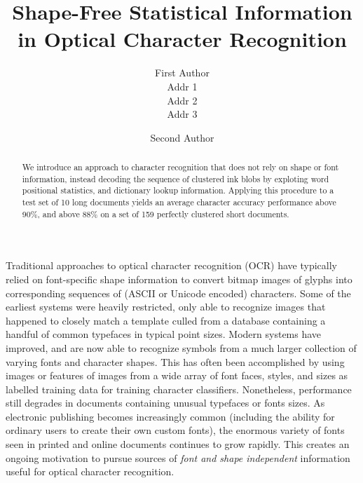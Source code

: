 \documentclass[times, 10pt,twocolumn]{article}
\begin{document}
\title{Shape-Free Statistical Information in Optical Character Recognition}

\author{First Author\\
Addr 1\\
Addr 2\\
Addr 3\\
\and
Second Author\\
}


\maketitle
\thispagestyle{empty}


\begin{abstract}
We introduce an approach to character recognition that does not rely on shape 
or font information, instead decoding the sequence of clustered ink blobs by
exploting word positional statistics, and dictionary lookup information.
Applying this procedure to a test set of 10 long documents yields an average
character accuracy performance above 90\%, and above 88\% on a set of 159
perfectly clustered short documents.
\end{abstract}



Traditional approaches to optical character recognition (OCR) have typically
relied on font-specific shape information to convert bitmap
images of glyphs into corresponding sequences of (ASCII or Unicode encoded)
characters.  Some of the earliest systems were heavily restricted, only
able to recognize images that happened to closely match a template culled from
a database containing a handful of common typefaces in typical point
sizes.  Modern systems have improved, and are now able to recognize
symbols from a much larger collection of varying fonts and character shapes.  
This has often been accomplished by using images or features of images from a 
wide array of font faces, styles, and sizes as labelled training data for 
training character classifiers.  Nonetheless, performance still degrades
in documents containing unusual typefaces or fonts sizes.  
As electronic publishing becomes increasingly common (including the
ability for ordinary users to create their own custom fonts), the enormous
variety of fonts seen in printed and online documents continues to grow rapidly.
This creates an ongoing motivation to pursue sources of {\em font and shape
independent} information useful for optical character recognition.
\end{document}
